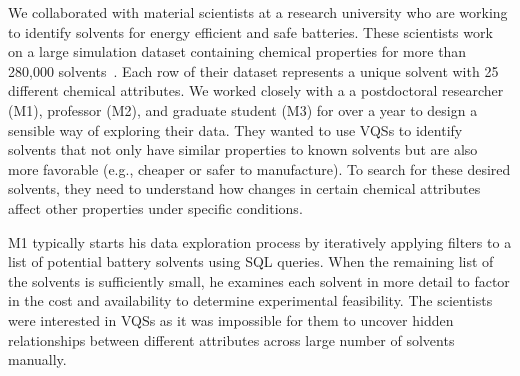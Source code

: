 \par\noindent{} We collaborated with material scientists at a research university who are working to identify solvents for energy efficient and safe batteries. These scientists work on a large simulation dataset containing chemical properties for more than 280,000 solvents~\cite{Khetan2018}. Each row of their dataset represents a unique solvent with 25 different chemical attributes. We worked closely with a a postdoctoral researcher (M1), professor (M2), and graduate student (M3) for over a year to design a sensible way of exploring their data. They wanted to use VQSs to identify solvents that not only have similar properties to known solvents but are also more favorable (e.g., cheaper or safer to manufacture). To search for these desired solvents, they need to understand how changes in certain chemical attributes affect other properties under specific conditions.
\par M1 typically starts his data exploration process by iteratively applying filters to a list of potential battery solvents using SQL queries. When the remaining list of the solvents is sufficiently small, he examines each solvent in more detail to factor in the cost and availability to determine experimental feasibility. The scientists were interested in VQSs as it was impossible for them to uncover hidden relationships between different attributes across large number of solvents manually.%
